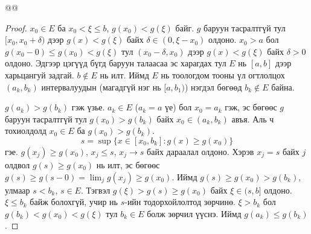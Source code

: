 @@
\begin{proof}
$x_0\in E$ ба $x_0<\xi\leqslant b$, $g(x_0)<g(\xi)$ байг. $g$ баруун тасралтгүй тул $[x_0,x_0+\delta)$ дээр $g(x)<g(\xi)$ байх $\delta\in(0,\xi-x_0)$ олдоно. $x_0>a$ бол $g(x_0-0)\leqslant g(x_0)<g(\xi)$ тул $(x_0-\delta,x_0)$ дээр $g(x)<g(\xi)$ байх $\delta>0$ олдоно. Эдгээр цэгүүд бүгд баруун талаасаа эс харагдах тул $E$ нь $[a,b]$ дээр харьцангуй задгай. $b\notin E$ нь илт. Иймд $E$ нь тоологдом тооны үл огтлолцох $(a_k,b_k)$ интервалуудын (магадгүй нэг нь $[a,b_1)$) нэгдэл бөгөөд $b_k\notin E$ байна.

$g(a_k)>g(b_k)$ гэж үзье. $a_k\in E$ ($a_k=a$ үе) бол $x_0=a_k$ гэж, эс бөгөөс $g$ баруун тасралтгүй тул $g(x_0)>g(b_k)$ байх $x_0\in(a_k,b_k)$ авъя. Аль ч тохиолдолд $x_0\in E$ ба $g(x_0)>g(b_k)$.
$$s=\sup\{x\in[x_0,b_k]: g(x)\geqslant g(x_0)\}$$
гэе. $g(x_j)\geqslant g(x_0)$, $x_j\leqslant s$, $x_j\to s$ байх дараалал олдоно. Хэрэв $x_j=s$ байх $j$ олдвол $g(s)\geqslant g(x_0)$ нь илт, эс бөгөөс $g(s)\geqslant g(s-0)=\lim_jg(x_j)\geqslant g(x_0)$. Иймд $g(s)\geqslant g(x_0)>g(b_k)$, улмаар $s<b_k$, $s\in E$. Тэгвэл $g(\xi)>g(s)\geqslant g(x_0)$ байх $\xi\in(s,b]$ олдоно. $\xi\leqslant b_k$ байж болохгүй, учир нь $s$-ийн тодорхойлолтод зөрчинө. $\xi>b_k$ бол $g(b_k)<g(x_0)<g(\xi)$ тул $b_k\in E$ болж зөрчил үүснэ. Иймд $g(a_k)\leqslant g(b_k)$.
\end{proof}

